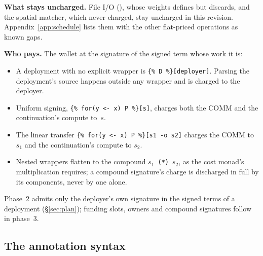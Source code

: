 \documentclass[11pt]{article}
\newcommand{\code}{\path}
\newcommand{\signed}[2]{\texttt{\{\%\,#1\,\%\}[#2]}}
\begin{document}
\textbf{What stays uncharged.} File I/O (\code{rho:io:fs:native:*}), whose weights \code{dev} defines but discards, and the spatial matcher, which \code{dev} never charged, stay uncharged in this revision. Appendix~\ref{app:schedule} lists them with the other flat-priced operations as known gaps.

\textbf{Who pays.} The wallet at the signature of the signed term whose work it is:
\begin{itemize}
\item A deployment with no explicit wrapper is \signed{D}{deployer}. Parsing the deployment's source happens outside any wrapper and is charged to the deployer.
\item Uniform signing, \signed{for(y <- x) P}{s}, charges both the COMM and the continuation's compute to~$s$.
\item The linear transfer \signed{for(y <- x) P}{s1 -o s2} charges the COMM to $s_1$ and the continuation's compute to $s_2$.
\item Nested wrappers flatten to the compound $s_1$~\texttt{(*)}~$s_2$, as the cost monad's multiplication requires; a compound signature's charge is discharged in full by its components, never by one alone.
\end{itemize}
Phase~2 admits only the deployer's own signature in the signed terms of a deployment (\S\ref{sec:plan}); funding slots, owners and compound signatures follow in phase~3.

\subsection{The annotation syntax}\label{sec:syntax}
\end{document}
